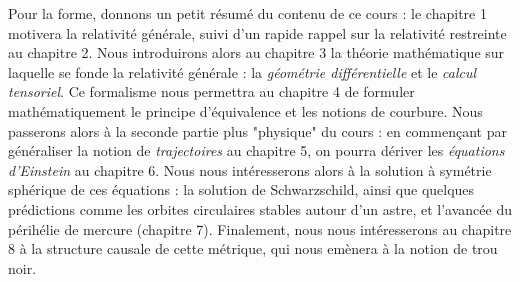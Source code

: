 Pour la forme, donnons un petit résumé du contenu de ce cours : le chapitre 1 motivera la relativité générale, suivi d'un rapide rappel sur la relativité restreinte au chapitre 2. Nous introduirons alors au chapitre 3 la théorie mathématique sur laquelle se fonde la relativité générale : la \emph{géométrie différentielle} et le \emph{calcul tensoriel}. Ce formalisme nous permettra au chapitre 4 de formuler mathématiquement le principe d'équivalence et les notions de courbure. Nous passerons alors à la seconde partie plus "physique" du cours : en commençant par généraliser la notion de \emph{trajectoires} au chapitre 5, on pourra dériver les \emph{équations d'Einstein} au chapitre 6. Nous nous intéresserons alors à la solution à symétrie sphérique de ces équations : la solution de Schwarzschild, ainsi que quelques prédictions comme les orbites circulaires stables autour d'un astre, et l'avancée du périhélie de mercure (chapitre 7). Finalement, nous nous intéresserons au chapitre 8 à la structure causale de cette métrique, qui nous emènera à la notion de trou noir.
\cutebreak